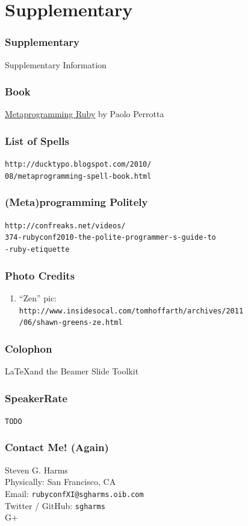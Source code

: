 \documentclass[slidestop,compress,mathserif]{beamer}
\begin{document}
\section{Supplementary} %
\label{sec:supplementary}

\begin{frame}
	\frametitle{Supplementary}
	\begin{center}
		Supplementary Information
	\end{center}
\end{frame}

\begin{frame}
	\frametitle{Book}
	\underline{Metaprogramming Ruby} by Paolo Perrotta
\end{frame}

\begin{frame}
	\frametitle{List of Spells}
	\texttt{http://ducktypo.blogspot.com/2010/\\08/metaprogramming-spell-book.html}
\end{frame}

\begin{frame}
	\frametitle{(Meta)programming Politely}
	\texttt{http://confreaks.net/videos/\\374-rubyconf2010-the-polite-programmer-s-guide-to\\-ruby-etiquette}
\end{frame}

\begin{frame}
	\frametitle{Photo Credits}
	\begin{enumerate}
		\footnotesize
		\item ``Zen'' pic:\\ \texttt{http://www.insidesocal.com/tomhoffarth/archives/2011\\
		 /06/shawn-greens-ze.html}
		\normalsize
	\end{enumerate}
\end{frame}

\begin{frame}
	\frametitle{Colophon}
	\LaTeX and the Beamer Slide Toolkit
\end{frame}

\begin{frame}
	\frametitle{SpeakerRate}
	\vskip 1.25cm
	\begin{center}
		\texttt{TODO}
	\end{center}
\end{frame}

\begin{frame}
	\frametitle{Contact Me! (Again)}
	\begin{center}
		Steven G. Harms \\
		\vskip 1.25cm
		Physically:  San Francisco, CA\\
		Email:  \texttt{rubyconfXI@sgharms.oib.com} \\
		Twitter / GitHub:  \texttt{sgharms} \\
		G+
	\end{center}
\end{frame}
\end{document}
